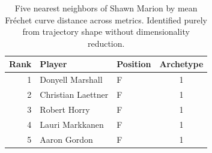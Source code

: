 \begin{table}[htbp]
  \centering\small
  \begin{tabular}{rllc}
    \toprule
    Rank & Player & Position & Archetype \\
    \midrule
    1 & Donyell Marshall & F & 1 \\
    2 & Christian Laettner & F & 1 \\
    3 & Robert Horry & F & 1 \\
    4 & Lauri Markkanen & F & 1 \\
    5 & Aaron Gordon & F & 1 \\
    \bottomrule
  \end{tabular}
  \caption{Five nearest neighbors of Shawn Marion by mean Fr\'{e}chet curve distance across metrics. Identified purely from trajectory shape without dimensionality reduction.}
  \label{tab:Shawn_Marion_frechet_curve_neighbors}
\end{table}

